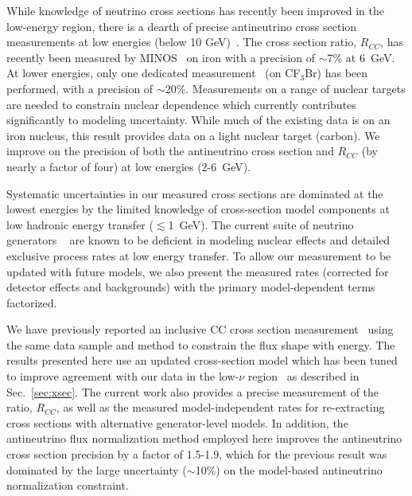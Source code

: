 \documentclass[aps,preprint,showpacs,superscriptaddress,linenumbers,nofootinbib,prd,12pt]{revtex4}
\newcommand{\ratio}{\ensuremath{R_{CC}}}
\begin{document}
While knowledge of neutrino cross sections has recently been improved in the low-energy region, there is a dearth 
of precise antineutrino cross section measurements at low energies (below 10 GeV)~\cite{Agashe:2014kda}. 
The cross section ratio,  \ratio{},
has recently been measured by MINOS~\cite{minos} on iron 
with a precision of $\sim$7\% at  6~GeV. At lower energies, only one 
dedicated measurement~\cite{Eichten:1973cs} (on CF$_3$Br) 
has been performed, with a precision of $\sim$20\%. 
Measurements on a range of nuclear targets are needed to 
constrain nuclear dependence which currently 
contributes significantly to modeling uncertainty.
While much of the existing data is on an iron nucleus, 
this result provides data on a light nuclear target 
(carbon). We improve on the precision of both the
antineutrino cross section and \ratio{} (by nearly a factor of four)
at low energies (2-6~GeV). 


Systematic uncertainties in our measured cross sections are dominated at the 
lowest energies by the limited knowledge of cross-section model components at low hadronic energy transfer ($\lesssim$1~GeV).
The current suite of neutrino generators ~\cite{Gazizov:2004va,genie,Buss:2011mx,Autiero:2005ve,Casper:2002sd, Battistoni:2009zzb,Golan:2012wx} 
are known to be deficient in modeling nuclear effects and detailed exclusive process rates at low energy transfer. To allow our measurement to be updated with future models, we also present the 
measured rates (corrected for detector effects and backgrounds) 
with the primary model-dependent terms factorized. 


We have previously reported an inclusive CC cross section measurement~\cite{DeVan:2016rkm} using
the same data sample and method to constrain the flux shape with energy. 
The results presented here use an updated cross-section model 
which has been tuned to improve agreement with our data in the low-$\nu$ 
region~\cite{Rodrigues:2015hik} as described in Sec.~\ref{sec:xsec}.
The current work also provides a precise measurement of the ratio, \ratio{}, as well as the measured
model-independent rates for re-extracting cross sections with 
alternative generator-level models.
In addition, the antineutrino flux normalization method employed here 
improves the antineutrino cross section precision by
a factor of 1.5-1.9, which for the previous result was 
dominated by the large uncertainty ($\sim$10\%) on the model-based antineutrino normalization constraint.
\end{document}

